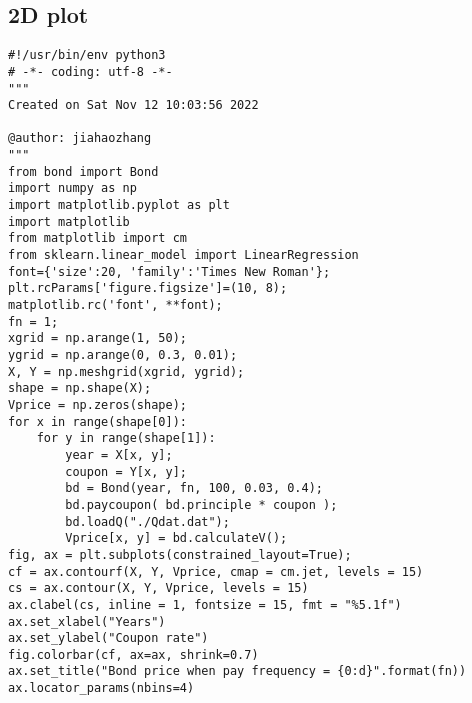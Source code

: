 \documentclass[a4paper,11pt]{article} %
\begin{document}
\subsection{2D plot}
\begin{lstlisting}
#!/usr/bin/env python3
# -*- coding: utf-8 -*-
"""
Created on Sat Nov 12 10:03:56 2022

@author: jiahaozhang
"""
from bond import Bond
import numpy as np
import matplotlib.pyplot as plt
import matplotlib
from matplotlib import cm
from sklearn.linear_model import LinearRegression
font={'size':20, 'family':'Times New Roman'};
plt.rcParams['figure.figsize']=(10, 8);
matplotlib.rc('font', **font);
fn = 1;
xgrid = np.arange(1, 50);
ygrid = np.arange(0, 0.3, 0.01);
X, Y = np.meshgrid(xgrid, ygrid);
shape = np.shape(X);
Vprice = np.zeros(shape);
for x in range(shape[0]):
    for y in range(shape[1]):
        year = X[x, y];
        coupon = Y[x, y];
        bd = Bond(year, fn, 100, 0.03, 0.4);
        bd.paycoupon( bd.principle * coupon );
        bd.loadQ("./Qdat.dat");
        Vprice[x, y] = bd.calculateV();
fig, ax = plt.subplots(constrained_layout=True);
cf = ax.contourf(X, Y, Vprice, cmap = cm.jet, levels = 15)
cs = ax.contour(X, Y, Vprice, levels = 15)
ax.clabel(cs, inline = 1, fontsize = 15, fmt = "%5.1f")
ax.set_xlabel("Years")
ax.set_ylabel("Coupon rate")
fig.colorbar(cf, ax=ax, shrink=0.7)
ax.set_title("Bond price when pay frequency = {0:d}".format(fn))
ax.locator_params(nbins=4)
\end{lstlisting}
\end{document}
